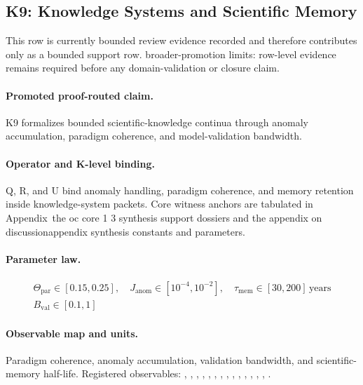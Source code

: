 \subsection{K9: Knowledge Systems and Scientific Memory}
\label{sec:oc-core-1-3-synthesis-k9}
This row is currently bounded review evidence recorded and therefore contributes only as a bounded support row.
broader-promotion limits: row-level evidence remains required before any domain-validation or closure claim.

\paragraph{Promoted proof-routed claim.}
K9 formalizes bounded scientific-knowledge continua through anomaly accumulation, paradigm coherence, and model-validation bandwidth.

\paragraph{Operator and K-level binding.}
Q, R, and U bind anomaly handling, paradigm coherence, and memory retention inside knowledge-system packets.
Core witness anchors are tabulated in Appendix~the oc core 1 3 synthesis support dossiers and the appendix on discussionappendix synthesis constants and parameters.

\paragraph{Parameter law.}
\[
\begin{gathered} \Theta_{\mathrm{par}} \in [0.15,0.25],\quad J_{\mathrm{anom}} \in [10^{-4},10^{-2}],\quad \tau_{\mathrm{mem}} \in [30,200]\,\mathrm{years} \\ B_{\mathrm{val}} \in [0.1,1] \end{gathered}
\]

\paragraph{Observable map and units.}
Paradigm coherence, anomaly accumulation, validation bandwidth, and scientific-memory half-life.
Registered observables: , \allowbreak {}, \allowbreak {}, \allowbreak {}, \allowbreak {}, \allowbreak {}, \allowbreak {}, \allowbreak {}, \allowbreak {}, \allowbreak {}, \allowbreak {}, \allowbreak {}, \allowbreak {}, \allowbreak {}, \allowbreak {}.


